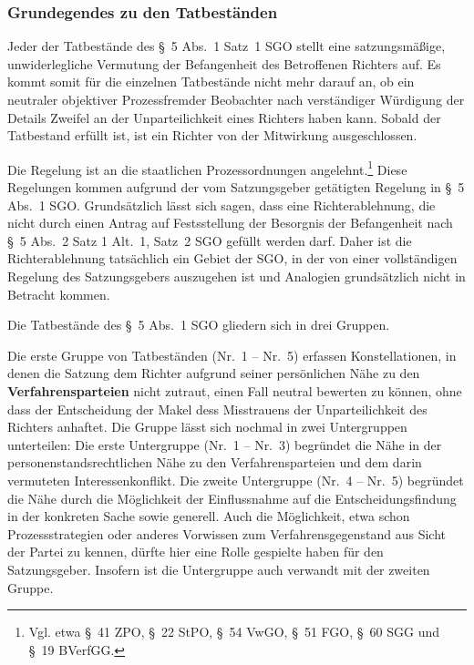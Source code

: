 \subsubsection{Grundegendes zu den Tatbeständen}
\label{Zusammensetzung:Spruchkoerper:Befangenheitsvermutung:Tatbestandsgrundsaetze}
Jeder der Tatbestände des \S~5 Abs.~1 Satz~1 SGO stellt eine satzungsmäßige, unwiderlegliche Vermutung der Befangenheit des Betroffenen Richters auf.
Es kommt somit für die einzelnen Tatbestände nicht mehr darauf an, ob ein neutraler objektiver Prozessfremder Beobachter nach verständiger Würdigung der Details Zweifel an der Unparteilichkeit eines Richters haben kann.
Sobald der Tatbestand erfüllt ist, ist ein Richter von der Mitwirkung ausgeschlossen.

Die Regelung ist an die staatlichen Prozessordnungen angelehnt.\footnote{Vgl. etwa \S~41 ZPO,  \S~22 StPO, \S~54 VwGO, \S~51 FGO, \S~60 SGG und \S~19 BVerfGG.}
Diese Regelungen kommen aufgrund der vom Satzungsgeber getätigten Regelung in \S~5 Abs.~1 SGO.
Grundsätzlich lässt sich sagen, dass eine Richterablehnung, die nicht durch einen Antrag auf Festsstellung der Besorgnis der Befangenheit nach \S~5 Abs.~2 Satz 1 Alt.~1, Satz~2 SGO gefüllt werden darf.
Daher ist die Richterablehnung tatsächlich ein Gebiet der SGO, in der von einer vollständigen Regelung des Satzungsgebers auszugehen ist und Analogien grundsätzlich nicht in Betracht kommen.

Die Tatbestände des \S~5 Abs.~1 SGO gliedern sich in drei Gruppen.

Die erste Gruppe von Tatbeständen (Nr.~1 -- Nr.~5) erfassen Konstellationen, in denen die Satzung dem Richter aufgrund seiner persönlichen Nähe zu den \textbf{Verfahrensparteien} nicht zutraut, einen Fall neutral bewerten zu können, ohne dass der Entscheidung der Makel dess Misstrauens der Unparteilichkeit des Richters anhaftet.
Die Gruppe lässt sich nochmal in zwei Untergruppen unterteilen:
Die erste Untergruppe (Nr.~1 -- Nr.~3) begründet die Nähe in der personenstandsrechtlichen Nähe zu den Verfahrensparteien und dem darin vermuteten Interessenkonflikt.
Die zweite Untergruppe (Nr.~4 -- Nr.~5) begründet die Nähe durch die Möglichkeit der Einflussnahme auf die Entscheidungsfindung in der konkreten Sache sowie generell. Auch die Möglichkeit, etwa schon Prozessstrategien oder anderes Vorwissen zum Verfahrensgegenstand aus Sicht der Partei zu kennen, dürfte hier eine Rolle gespielte haben für den Satzungsgeber. Insofern ist die Untergruppe auch verwandt mit der zweiten Gruppe.

